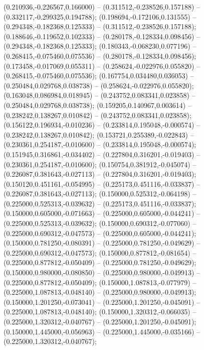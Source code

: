  (0.210936,-0.226567,0.166000) -- (0.311512,-0.238526,0.157188) -- (0.332117,-0.299325,0.194788);
 (0.198694,-0.172106,0.131555) -- (0.294348,-0.182368,0.125333) -- (0.311512,-0.238526,0.157188);
 (0.188646,-0.119652,0.102333) -- (0.280178,-0.128334,0.098456) -- (0.294348,-0.182368,0.125333);
 (0.180343,-0.068230,0.077196) -- (0.268415,-0.075460,0.075536) -- (0.280178,-0.128334,0.098456);
 (0.173458,-0.017069,0.055311) -- (0.258624,-0.022976,0.055820) -- (0.268415,-0.075460,0.075536);
 (0.167754,0.034480,0.036053) -- (0.250484,0.029768,0.038738) -- (0.258624,-0.022976,0.055820);
 (0.163048,0.086984,0.018945) -- (0.243752,0.083341,0.023858) -- (0.250484,0.029768,0.038738);
 (0.159205,0.140967,0.003614) -- (0.238242,0.138267,0.010842) -- (0.243752,0.083341,0.023858);
 (0.156122,0.196934,-0.010236) -- (0.233814,0.195048,-0.000574) -- (0.238242,0.138267,0.010842);
 (0.153721,0.255389,-0.022843) -- (0.230361,0.254187,-0.010600) -- (0.233814,0.195048,-0.000574);
 (0.151945,0.316861,-0.034402) -- (0.227804,0.316201,-0.019403) -- (0.230361,0.254187,-0.010600);
 (0.150754,0.381912,-0.045074) -- (0.226087,0.381643,-0.027113) -- (0.227804,0.316201,-0.019403);
 (0.150120,0.451161,-0.054995) -- (0.225173,0.451116,-0.033837) -- (0.226087,0.381643,-0.027113);
 (0.150000,0.525312,-0.064198) -- (0.225000,0.525313,-0.039632) -- (0.225173,0.451116,-0.033837);
 (0.150000,0.605000,-0.071663) -- (0.225000,0.605000,-0.044241) -- (0.225000,0.525313,-0.039632);
 (0.150000,0.690312,-0.077060) -- (0.225000,0.690312,-0.047573) -- (0.225000,0.605000,-0.044241);
 (0.150000,0.781250,-0.080391) -- (0.225000,0.781250,-0.049629) -- (0.225000,0.690312,-0.047573);
 (0.150000,0.877812,-0.081654) -- (0.225000,0.877812,-0.050409) -- (0.225000,0.781250,-0.049629);
 (0.150000,0.980000,-0.080850) -- (0.225000,0.980000,-0.049913) -- (0.225000,0.877812,-0.050409);
 (0.150000,1.087813,-0.077979) -- (0.225000,1.087813,-0.048140) -- (0.225000,0.980000,-0.049913);
 (0.150000,1.201250,-0.073041) -- (0.225000,1.201250,-0.045091) -- (0.225000,1.087813,-0.048140);
 (0.150000,1.320312,-0.066035) -- (0.225000,1.320312,-0.040767) -- (0.225000,1.201250,-0.045091);
 (0.150000,1.445000,-0.056963) -- (0.225000,1.445000,-0.035166) -- (0.225000,1.320312,-0.040767);

